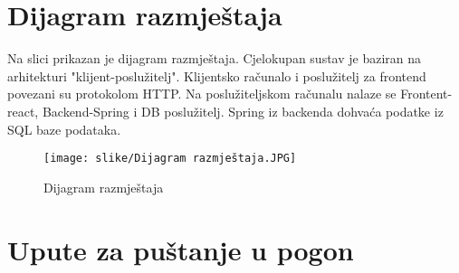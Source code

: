 			\eject 
		
		
		\section{Dijagram razmještaja}

		{Na slici prikazan je dijagram razmještaja. Cjelokupan sustav je baziran na arhitekturi "klijent-poslužitelj". Klijentsko računalo i poslužitelj za frontend povezani su protokolom HTTP. Na poslužiteljskom računalu nalaze se Frontent-react, Backend-Spring i DB poslužitelj. Spring iz backenda dohvaća podatke iz SQL baze podataka.}
			
		\begin{figure}[H]
			\texttt{[image: slike/Dijagram razmještaja.JPG]}
			\centering
			\caption{Dijagram razmještaja}
			\label{fig:Dijagram razmještaja}
		\end{figure}
		\eject 
		
		\section{Upute za puštanje u pogon}
		
		
			
			
			
			
			\eject 
